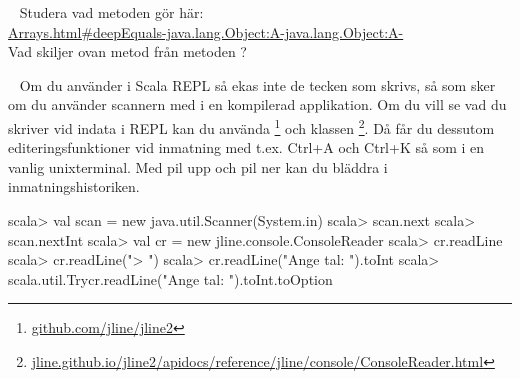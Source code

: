 {\SOLUTION


\TaskSolved \what


\SubtaskSolved

\SubtaskSolved

\SubtaskSolved



\QUESTEND









\QUESTBEGIN

\Task  \what~ Studera vad metoden  gör här:\\
\href{https://docs.oracle.com/javase/8/docs/api/java/util/Arrays.html#deepEquals-java.lang.Object:A-java.lang.Object:A-}{Arrays.html\#deepEquals-java.lang.Object:A-java.lang.Object:A-} \\
Vad skiljer ovan metod från metoden ?

\SOLUTION


\TaskSolved \what




\QUESTEND









\QUESTBEGIN

\Task  \what~  Om du använder   i Scala REPL så ekas inte de tecken som skrivs, så som sker om du använder scannern med  i en kompilerad applikation. Om du vill se vad du skriver vid indata i REPL kan du använda \footnote{
\href{https://github.com/jline/jline2}{github.com/jline/jline2}
} och klassen \footnote{
\href{http://jline.github.io/jline2/apidocs/reference/jline/console/ConsoleReader.html}{jline.github.io/jline2/apidocs/reference/jline/console/ConsoleReader.html}}.
Då får du dessutom editeringsfunktioner vid inmatning med t.ex. Ctrl+A och Ctrl+K så som i en vanlig unixterminal. Med pil upp och pil ner kan du bläddra i inmatningshistoriken.
\begin{REPL}
scala> val scan = new java.util.Scanner(System.in)
scala> scan.next
scala> scan.nextInt
scala> val cr = new jline.console.ConsoleReader
scala> cr.readLine
scala> cr.readLine("> ")
scala> cr.readLine("Ange tal: ").toInt
scala> scala.util.Try{cr.readLine("Ange tal: ").toInt}.toOption
\end{REPL}

}
